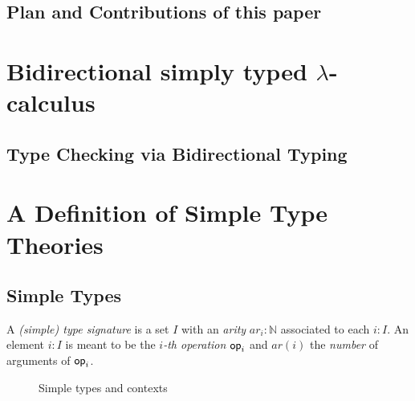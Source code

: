 \documentclass[acmsmall]{acmart}
\begin{document}
\subsection{Plan and Contributions of this paper}

\section{Bidirectional simply typed \texorpdfstring{$\lambda$}{lambda}-calculus}
\subsection{Type Checking via Bidirectional Typing}

\section{A Definition of Simple Type Theories}
\subsection{Simple Types}
\begin{definition}
  A \emph{(simple) type signature} is a set $I$ with an \emph{arity} $\mathit{ar}_i : \mathbb{N}$ associated to each $i : I$.
  An element $i : I$ is meant to be the \emph{$i$-th operation} $\mathsf{op}_{i}$ and $\mathit{ar}(i)$ the \emph{number} of arguments of $\mathsf{op}_{i}$.
\end{definition}
\begin{figure}
  \begin{subfigure}{.5\textwidth}
  \end{subfigure}
  \begin{subfigure}{.4\textwidth}
  \end{subfigure}
  \caption{Simple types and contexts}
\end{figure}
\end{document}
